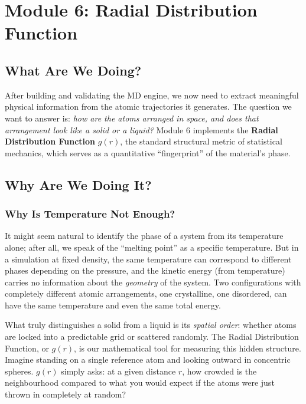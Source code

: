 
\newpage
\section{Module 6: Radial Distribution Function}

\subsection{What Are We Doing?}

After building and validating the MD engine, we now need to extract meaningful physical information from the atomic trajectories it generates. The question we want to answer is: \textit{how are the atoms arranged in space, and does that arrangement look like a solid or a liquid?} Module 6 implements the \textbf{Radial Distribution Function} $g(r)$, the standard structural metric of statistical mechanics, which serves as a quantitative ``fingerprint'' of the material's phase.

\subsection{Why Are We Doing It?}

\subsubsection{Why Is Temperature Not Enough?}

It might seem natural to identify the phase of a system from its temperature alone; after all, we speak of the ``melting point'' as a specific temperature. But in a simulation at fixed density, the same temperature can correspond to different phases depending on the pressure, and the kinetic energy (from temperature) carries no information about the \emph{geometry} of the system. Two configurations with completely different atomic arrangements, one crystalline, one disordered, can have the same temperature and even the same total energy.

What truly distinguishes a solid from a liquid is its \emph{spatial order}: whether atoms are locked into a predictable grid or scattered randomly. The Radial Distribution Function, or $g(r)$, is our mathematical tool for measuring this hidden structure. Imagine standing on a single reference atom and looking outward in concentric spheres. $g(r)$ simply asks: at a given distance $r$, how crowded is the neighbourhood compared to what you would expect if the atoms were just thrown in completely at random?

